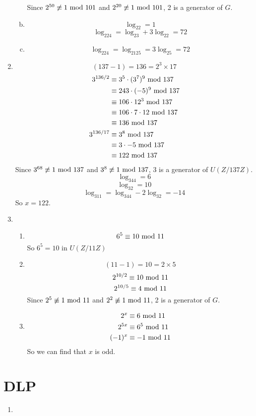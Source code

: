 \documentclass{article}
\renewcommand{\mod}{{\rm\ mod\ }}
\begin{document}
\begin{enumerate}
\begin{enumerate}[(a)]
Since $2^{50}\not\equiv1\mod101$ and $2^{20}\not\equiv1\mod101$, 2 is a generator of $G$.
\item
$$\log_22=1$$
$$\log_224=\log_23+3\log_22=72$$
\item
$$\log_224=\log_2125=3\log_25=72$$
\end{enumerate}

\item
$$(137-1)=136=2^3\times17$$
\begin{align*}
3^{136/2}&\equiv3^5\cdot(3^{7})^9\mod 137\\
&\equiv243\cdot(-5)^9\mod 137\\
&\equiv106\cdot12^3\mod 137\\
&\equiv106\cdot7\cdot12\mod 137\\
&\equiv136\mod 137\\
3^{136/17}&\equiv3^8\mod 137\\
&\equiv3\cdot-5\mod 137\\
&\equiv122\mod 137
\end{align*}
Since $3^{68}\not\equiv1\mod 137$ and $3^{8}\not\equiv1\mod 137$, 3 is a generator of $U(Z/137Z)$.\\
$$\log_344=6$$
$$\log_32=10$$
$$\log_311=\log_344-2\log_32=-14$$
So $x=122$.
\item
\begin{enumerate}
\item
$$6^5\equiv10\mod11$$
So $6^5=10$ in $U(Z/11Z)$
\item
$$(11-1)=10=2\times5$$
$$2^{10/2}\equiv10\mod 11$$
$$2^{10/5}\equiv4\mod 11$$
Since $2^{5}\not\equiv1\mod11$ and $2^{2}\not\equiv1\mod11$, 2 is a generator of $G$.
\item
\begin{align*}
2^x&\equiv6\mod 11\\
2^{5x}&\equiv6^5\mod 11\\
(-1)^x&\equiv-1\mod 11
\end{align*}
So we can find that $x$ is odd.
\end{enumerate}
\end{enumerate}

\section{DLP}
\begin{enumerate}
\item

\end{enumerate}
\end{document}
